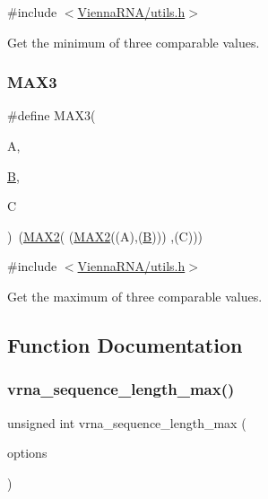 {\ttfamily \#include $<$\mbox{\hyperlink{utils_8h}{Vienna\+R\+N\+A/utils.\+h}}$>$}



Get the minimum of three comparable values. 

\mbox{\label{group__utils_ga8d577123d2e66d2b7d0bf9af6e172b93}} 
\subsubsection{\texorpdfstring{M\+A\+X3}{MAX3}}
{\footnotesize\ttfamily \#define M\+A\+X3(\begin{DoxyParamCaption}\item[{}]{A,  }\item[{}]{\mbox{\hyperlink{group__energy__parameters__rw_gga7bf2bb363bcf5ce50d60255d256e5682a3f2a77ecd272aa6d6b5902faa5e5fc68}{B}},  }\item[{}]{C }\end{DoxyParamCaption})~(\mbox{\hyperlink{group__utils_ga33297b3679c713b0c4d897cd0fe3b122}{M\+A\+X2}}(  (\mbox{\hyperlink{group__utils_ga33297b3679c713b0c4d897cd0fe3b122}{M\+A\+X2}}((A),(\mbox{\hyperlink{group__energy__parameters__rw_gga7bf2bb363bcf5ce50d60255d256e5682a3f2a77ecd272aa6d6b5902faa5e5fc68}{B}}))) ,(C)))}



{\ttfamily \#include $<$\mbox{\hyperlink{utils_8h}{Vienna\+R\+N\+A/utils.\+h}}$>$}



Get the maximum of three comparable values. 



\subsection{Function Documentation}
\mbox{\label{group__utils_ga0fe05749df8bae9d2eda9013d6ba5551}} 
\subsubsection{\texorpdfstring{vrna\+\_\+sequence\+\_\+length\+\_\+max()}{vrna\_sequence\_length\_max()}}
{\footnotesize\ttfamily unsigned int vrna\+\_\+sequence\+\_\+length\+\_\+max (\begin{DoxyParamCaption}\item[{unsigned int}]{options }\end{DoxyParamCaption})}



